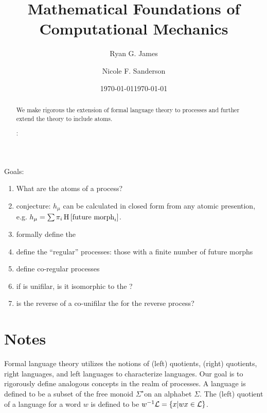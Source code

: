 \documentclass[prl,twocolumn,superscriptaddress,preprintnumbers,floatfix]{revtex4-1}
\begin{document}
\title{Mathematical Foundations of Computational Mechanics}

\author{Ryan G. James}

\author{Nicole F. Sanderson}

\date{\today}


\date{\today}

\begin{abstract}

We make rigorous the extension of formal language theory to processes and further extend the theory to include atoms. 

\vspace{0.1in}
:

\end{abstract}

\maketitle

Goals:
\begin{enumerate}
  \item What are the atoms of a process?
  \item conjecture: $h_\mu$ can be calculated in closed form from any atomic presention, e.g. $h_\mu = \sum \pi_i \operatorname{H}\left[\textrm{future morph}_i\right]$.
  \item formally define the \etomata
  \item define the ``regular'' processes: those with a finite number of future morphs
  \item define co-regular processes
  \item if \etomata is unifilar, is it isomorphic to the \emachine?
  \item is the reverse of a co-unifilar \emachine the \emachine for the reverse process?
\end{enumerate}

\section{Notes}
Formal language theory utilizes the notions of (left) quotients, (right) quotients, right languages, and left languages to characterize languages.  Our goal is to rigorously define analogous concepts in the realm of processes.  A language \Language is defined to be a subset of the free monoid $\Sigma^{\star}$on an alphabet $\Sigma$. The (left) quotient of a language \Language for a word $w$ is defined to be $w^{-1}\mathcal{L} = \{ x | wx \in \mathcal{L} \}$. 
\end{document}
